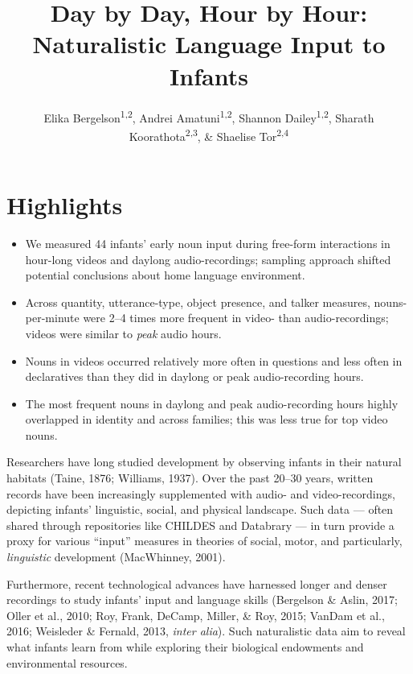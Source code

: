 \documentclass[man]{apa6}
\title{Day by Day, Hour by Hour: Naturalistic Language Input to Infants}
\author{Elika Bergelson\textsuperscript{1,2}, Andrei Amatuni\textsuperscript{1,2}, Shannon Dailey\textsuperscript{1,2}, Sharath Koorathota\textsuperscript{2,3}, \& Shaelise Tor\textsuperscript{2,4}}
\affiliation{
    \vspace{0.5cm}
          \textsuperscript{1} Duke University\\
          \textsuperscript{2} University of Rochester\\
          \textsuperscript{3} Columbia University Medical Center\\
          \textsuperscript{4} Syracuse University  }
\providecommand{\tightlist}{%
  \setlength{\itemsep}{0pt}\setlength{\parskip}{0pt}}
\theoremstyle{definition}
\theoremstyle{definition}
\theoremstyle{definition}
\theoremstyle{remark}
\begin{document}
\maketitle

\setcounter{secnumdepth}{0}



\hypertarget{highlights}{%
\section{Highlights}\label{highlights}}

\begin{itemize}
\tightlist
\item
  We measured 44 infants' early noun input during free-form interactions
  in hour-long videos and daylong audio-recordings; sampling approach
  shifted potential conclusions about home language environment.
\item
  Across quantity, utterance-type, object presence, and talker measures,
  nouns-per-minute were 2--4 times more frequent in video- than
  audio-recordings; videos were similar to \emph{peak} audio hours.
\item
  Nouns in videos occurred relatively more often in questions and less
  often in declaratives than they did in daylong or peak audio-recording
  hours.
\item
  The most frequent nouns in daylong and peak audio-recording hours
  highly overlapped in identity and across families; this was less true
  for top video nouns.
\end{itemize}

Researchers have long studied development by observing infants in their
natural habitats (Taine, 1876; Williams, 1937). Over the past 20--30
years, written records have been increasingly supplemented with audio-
and video-recordings, depicting infants' linguistic, social, and
physical landscape. Such data --- often shared through repositories like
CHILDES and Databrary --- in turn provide a proxy for various
\enquote{input} measures in theories of social, motor, and particularly,
\emph{linguistic} development (MacWhinney, 2001).

Furthermore, recent technological advances have harnessed longer and
denser recordings to study infants' input and language skills (Bergelson
\& Aslin, 2017; Oller et al., 2010; Roy, Frank, DeCamp, Miller, \& Roy,
2015; VanDam et al., 2016; Weisleder \& Fernald, 2013, \emph{inter
alia}). Such naturalistic data aim to reveal what infants learn from
while exploring their biological endowments and environmental resources.
\end{document}
